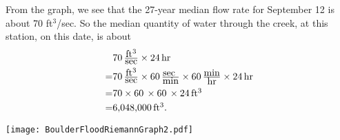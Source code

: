 \documentclass[12pt]{article}
\def\Red{\color{red}}
\def\Black{\color{black}}
\def\Red{\color{red}}
\def\Black{\color{black}}
\begin{document}
\begin{enumerate}[(a)]
\Red From the graph, we see that the 27-year median flow rate for September 12 is about 70  ft$^3$/sec.  So the median quantity of water through the creek, at this station, on this date, is about
\begin{align*}& 70\,  {\textstyle\frac{\hbox{ft$^3$}}{\hbox{sec}}}\times  24\,  \hbox{hr} \\=& 70\,  {\textstyle\frac{\hbox{ft$^3$}}{\hbox{sec}}}\times 60\,  {\textstyle\frac{\hbox{sec }}{\hbox{min}}}\times 60\,  {\textstyle\frac{\hbox{min}}{\hbox{hr}}}\times  24\,  \hbox{hr}
\\=& 70\times 60\,   \times 60\, \times  24 \, \hbox{ft$^3$} 
\\=& \hbox{6,048,000}\, \hbox{ft$^3$.} \end{align*} \Black

\vfill
\end{enumerate}
\newpage

\begin{center}
\texttt{[image: BoulderFloodRiemannGraph2.pdf]}
\end{center}
\end{document}
